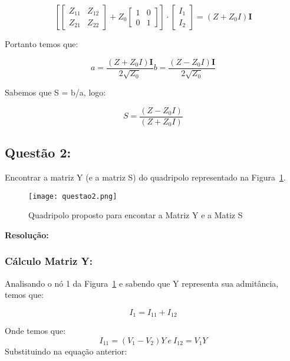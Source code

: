 \documentclass[a4paper,12pt]{proc}
\begin{document}
\[\left [ \begin{bmatrix} Z_{11} & Z_{12} \\ Z_{21} & Z_{22} \end{bmatrix} + Z_{0}\begin{bmatrix} 1 & 0 \\ 0 & 1 \end{bmatrix} \right ]\cdot \begin{bmatrix} I_{1}\\ I_{2} \end{bmatrix} = (Z + Z_{0}I)\textbf{I}\]

\noindent Portanto temos que:

\begin{subequations}
    \label{eqn7}
    \begin{equation}
        \label{eqn7:1}
        a = \frac{(Z + Z_{0}I)\textbf{I}}{2\sqrt{Z_{0}}}
    \end{equation}

    \begin{equation}
        \label{eqn7:2}
        b = \frac{(Z - Z_{0}I)\textbf{I}}{2\sqrt{Z_{0}}}
    \end{equation}
\end{subequations}

\noindent Sabemos que S = b/a, logo:

\[S = \frac{(Z - Z_{0}I)}{(Z + Z_{0}I)}\]

\subsection{Questão 2:}
Encontrar a matriz Y (e a matriz S) do quadripolo representado na Figura~\ref{quest2}.

\begin{figure}[htbp]
    \centering
    \texttt{[image: questao2.png]}
    \caption{Quadripolo proposto para encontar a Matriz Y e a Matiz S}
    \label{quest2}
\end{figure}

\textbf{Resolução:}

\subsubsection{Cálculo Matriz Y:}

Analisando o nó 1 da Figura~\ref{quest2} e sabendo que Y representa sua admitância, temos que:

\[I_{1} = I_{11} + I_{12}\]

\noindent Onde temos que:
\[I_{11} = (V_{1} - V_{2})Y ~e~ I_{12} = V_{1}Y\]
\noindent Substituindo na equação anterior:
\end{document}
